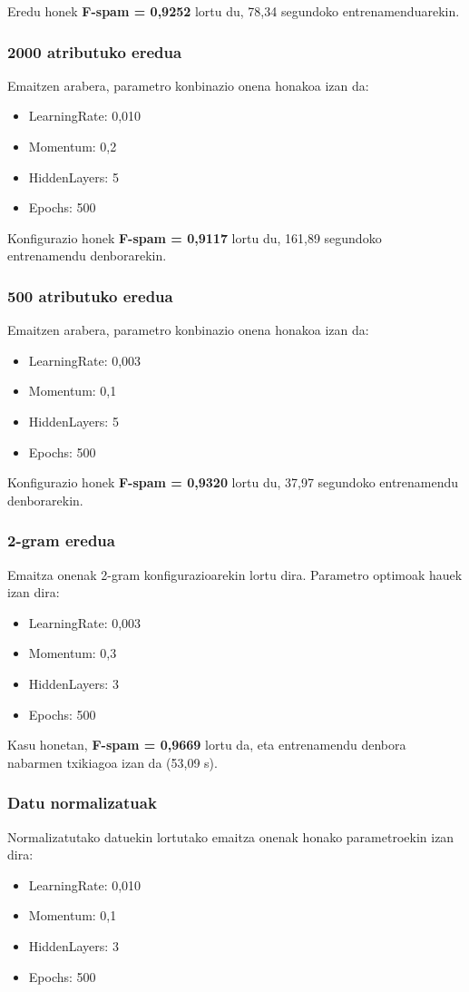 \documentclass[12pt, a4paper]{article}
\begin{document}
Eredu honek \textbf{F-spam = 0,9252} lortu du, 78,34 segundoko entrenamenduarekin.

\subsubsection*{2000 atributuko eredua}
Emaitzen arabera, parametro konbinazio onena honakoa izan da:
\begin{itemize}
    \item LearningRate: 0,010
    \item Momentum: 0,2
    \item HiddenLayers: 5
    \item Epochs: 500
\end{itemize}

Konfigurazio honek \textbf{F-spam = 0,9117} lortu du, 161,89 segundoko entrenamendu denborarekin.

\subsubsection*{500 atributuko eredua}
Emaitzen arabera, parametro konbinazio onena honakoa izan da:
\begin{itemize}
    \item LearningRate: 0,003
    \item Momentum: 0,1
    \item HiddenLayers: 5
    \item Epochs: 500
\end{itemize}

Konfigurazio honek \textbf{F-spam = 0,9320} lortu du, 37,97 segundoko entrenamendu denborarekin.

\subsubsection*{2-gram eredua}
Emaitza onenak 2-gram konfigurazioarekin lortu dira. Parametro optimoak hauek izan dira:
\begin{itemize}
    \item LearningRate: 0,003
    \item Momentum: 0,3
    \item HiddenLayers: 3
    \item Epochs: 500
\end{itemize}

Kasu honetan, \textbf{F-spam = 0,9669} lortu da, eta entrenamendu denbora nabarmen txikiagoa izan da (53,09 s).

\subsubsection*{Datu normalizatuak}
Normalizatutako datuekin lortutako emaitza onenak honako parametroekin izan dira:
\begin{itemize}
    \item LearningRate: 0,010
    \item Momentum: 0,1
    \item HiddenLayers: 3
    \item Epochs: 500
\end{itemize}
\end{document}
